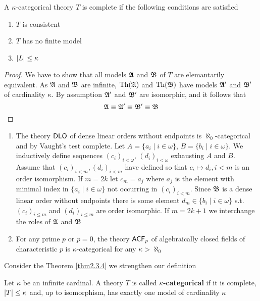 \documentclass[11pt]{article}
\begin{document}
\begin{theorem}
\label{thm2.3.4}
A \(\kappa\)-categorical theory \(T\) is complete if the following conditions
are satisfied
\begin{enumerate}
\item \(T\) is consistent
\item \(T\) has no finite model
\item \(\abs{L}\le\kappa\)
\end{enumerate}
\end{theorem}

\begin{proof}
We have to show that all models \(\mathfrak{A}\) and \(\mathfrak{B}\) of \(T\) are elemantarily
equivalent. As \(\mathfrak{A}\) and \(\mathfrak{B}\) are infinite, \(\operatorname{Th}(\mathfrak{A})\) and
\(\operatorname{Th}(\mathfrak{B})\) have models \(\mathfrak{A}'\) and \(\mathfrak{B}'\) of cardinality \(\kappa\). By
assumption \(\mathfrak{A}'\) and \(\mathfrak{B}'\) are isomorphic, and it follows that
\begin{equation*}
\mathfrak{A}\equiv\mathfrak{A}'\equiv\mathfrak{B}'\equiv\mathfrak{B}
\end{equation*}
\end{proof}

\begin{examplle}[]
\begin{enumerate}
\item The theory \(\operatorname{\textsf{DLO}}\) of dense linear orders without endpoints is
\(\aleph_0\)-categorical and by Vaught's test complete. Let
\(A=\{a_i\mid i\in\omega\}\), \(B=\{b_i\mid i\in\omega\}\).
We inductively define
sequences \((c_i)_{i<\omega}\), \((d_i)_{i<\omega}\) exhausting \(A\) and \(B\).
Assume that \((c_i)_{i<m},(d_i)_{i<m}\) have defined so that \(c_i\mapsto
      d_i,i<m\) is an order isomorphism. If \(m=2k\) let \(c_m=a_j\) where
\(a_j\) is the element with minimal index in \(\{a_i\mid i\in\omega\}\)
not occurring in \((c_i)_{i<m}\). Since \(\mathfrak{B}\) is a dense linear order
without endpoints there is some element \(d_m\in\{b_i\mid i\in\omega\}\)
s.t. \((c_i)_{i\le m}\) and \((d_i)_{i\le m}\) are order isomorphic. If
\(m=2k+1\) we interchange the roles of \(\mathfrak{A}\) and \(\mathfrak{B}\)
\item For any prime \(p\) or \(p=0\), the theory \(\textsf{ACF}_p\) of algebraically closed fields of
characteristic \(p\) is \(\kappa\)-categorical for any \(\kappa>\aleph_0\)
\end{enumerate}
\end{examplle}


Consider the Theorem \ref{thm2.3.4} we strengthen our definition
\begin{definition}[]
Let \(\kappa\) be an infinite cardinal. A theory \(T\) is called
\textbf{\(\kappa\)-categorical} if it is complete, \(\abs{T}\le\kappa\) and, up to
isomorphism, has exactly one model of cardinality \(\kappa\)
\end{definition}
\end{document}
